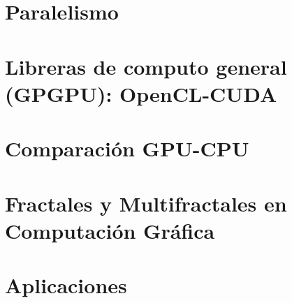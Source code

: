 \documentclass[spanish,a4paper,openright,11pt]{book}
\begin{document}
\section{Paralelismo}
\section{Libreras de computo general (GPGPU): OpenCL-CUDA}
\section{Comparación GPU-CPU}
\section{Fractales y Multifractales en Computación Gráfica}
\section{Aplicaciones}





\end{document}
